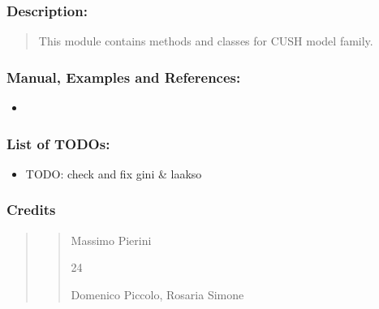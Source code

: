\documentclass[letterpaper,10pt,english]{sphinxmanual}
\begin{document}
\subsubsection{Description:}
\label{\detokenize{cubmods:id43}}\begin{quote}

\sphinxAtStartPar
This module contains methods and classes
for CUSH model family.
\end{quote}


\subsubsection{Manual, Examples and References:}
\label{\detokenize{cubmods:id44}}\begin{itemize}
\item {} 
\sphinxAtStartPar
{}

\end{itemize}


\subsubsection{List of TODOs:}
\label{\detokenize{cubmods:id45}}\begin{itemize}
\item {} 
\sphinxAtStartPar
TODO: check and fix gini \& laakso

\end{itemize}


\subsubsection{Credits}
\label{\detokenize{cubmods:id46}}\begin{quote}
\begin{quote}\begin{description}
\sphinxAtStartPar
Massimo Pierini

\sphinxhyphen{}24

\sphinxAtStartPar
Domenico Piccolo, Rosaria Simone

\sphinxAtStartPar
{}

\end{description}\end{quote}
\end{quote}
\end{document}
